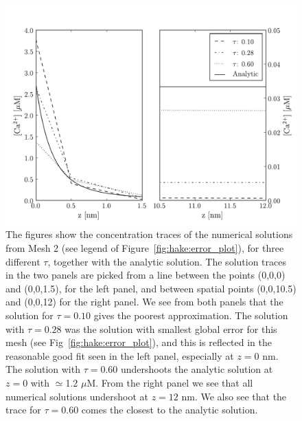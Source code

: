 \begin{figure}
    \label{fig:hake:traces_mesh_2}
  \centering
    \includegraphics[width=\largefig]{chapters/hake/pdf/traces_mesh_2}
    \caption[Concentration traces 2]{The figures show the
      concentration traces of the numerical solutions from Mesh 2 (see
      legend of Figure~\ref{fig:hake:error_plot}), for three different
      $\tau$, together with the analytic solution. The solution traces
      in the two panels are picked from a line between the points
      (0,0,0) and (0,0,1.5), for the left panel, and between spatial
      points (0,0,10.5) and (0,0,12) for the right panel. We see from
      both panels that the solution for $\tau=0.10$ gives the poorest
      approximation. The solution with $\tau=0.28$ was the solution
      with smallest global error for this mesh (see
      Fig~\ref{fig:hake:error_plot}), and this is reflected in the
      reasonable good fit seen in the left panel, especially at $z=0$
      nm. The solution with $\tau=0.60$ undershoots the analytic
      solution at $z=0$ with $\simeq$1.2 $\mu$M. From the right panel
      we see that all numerical solutions undershoot at $z=12$ nm. We
      also see that the trace for $\tau=0.60$ comes the closest to the
      analytic solution.}
\end{figure}

